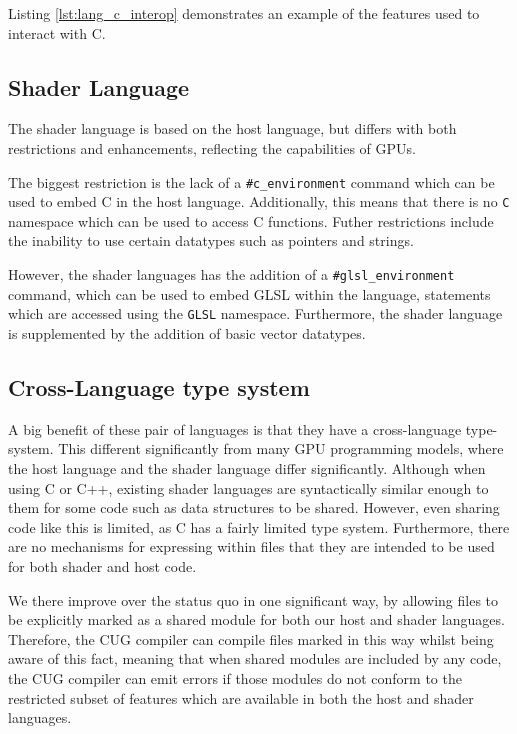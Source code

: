 \documentclass[a4paper,12pt,twoside,openright]{report}
\begin{document}
Listing \ref{lst:lang_c_interop} demonstrates an example of the features used
to interact with C.

\subsection{Shader Language}

The shader language is based on the host language, but differs with both
restrictions and enhancements, reflecting the capabilities of GPUs.

The biggest restriction is the lack of a \texttt{\#c\_environment} command
which can be used to embed C in the host language. Additionally, this means
that there is no \texttt{C} namespace which can be used to access C functions.
Futher restrictions include the inability to use certain datatypes such as
pointers and strings.

However, the shader languages has the addition of a
\texttt{\#glsl\_environment} command, which can be used to embed GLSL within
the language, statements which are accessed using the \texttt{GLSL} namespace.
Furthermore, the shader language is supplemented by the addition of basic
vector datatypes.



\subsection{Cross-Language type system}

A big benefit of these pair of languages is that they have a cross-language
type-system. This different significantly from many GPU programming models,
where the host language and the shader language differ significantly. Although
when using C or C++, existing shader languages are syntactically similar enough
to them for some code such as data structures to be shared. However, even
sharing code like this is limited, as C has a fairly limited type system.
Furthermore, there are no mechanisms for expressing within files that they are
intended to be used for both shader and host code.

We there improve over the status quo in one significant way, by allowing files
to be explicitly marked as a shared module for both our host and shader
languages. Therefore, the CUG compiler can compile files marked in this way whilst
being aware of this fact, meaning that when shared modules are included by any
code, the CUG compiler can emit errors if those modules do not conform to the
restricted subset of features which are available in both the host and shader
languages.
\end{document}
